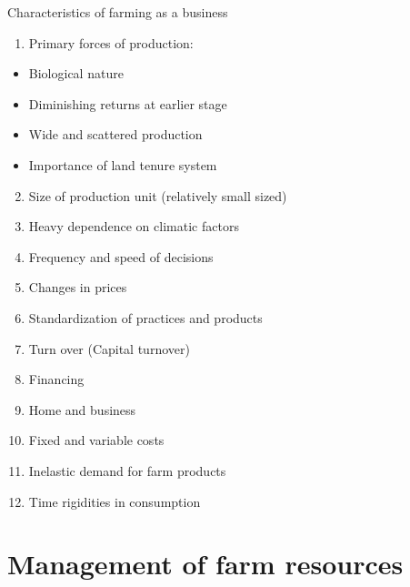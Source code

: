 \documentclass[12pt,ignorenonframetext,aspectratio=169]{beamer}
\providecommand{\tightlist}{%
  \setlength{\itemsep}{0pt}\setlength{\parskip}{0pt}}
\begin{document}
\begin{frame}{Characteristics of farming as a business}
\protect\hypertarget{characteristics-of-farming-as-a-business}{}

\begin{enumerate}
\tightlist
\item
  Primary forces of production:
\end{enumerate}

\begin{itemize}
\tightlist
\item
  Biological nature
\item
  Diminishing returns at earlier stage
\item
  Wide and scattered production
\item
  Importance of land tenure system
\end{itemize}

\begin{enumerate}
\setcounter{enumi}{1}
\tightlist
\item
  Size of production unit (relatively small sized)
\item
  Heavy dependence on climatic factors
\item
  Frequency and speed of decisions
\item
  Changes in prices
\item
  Standardization of practices and products
\item
  Turn over (Capital turnover)
\item
  Financing
\item
  Home and business
\item
  Fixed and variable costs
\item
  Inelastic demand for farm products
\item
  Time rigidities in consumption
\end{enumerate}

\end{frame}

\hypertarget{management-of-farm-resources}{%
\section{Management of farm
resources}\label{management-of-farm-resources}}

\hypertarget{section-2}{%
\subsection{}\label{section-2}}
\end{document}
